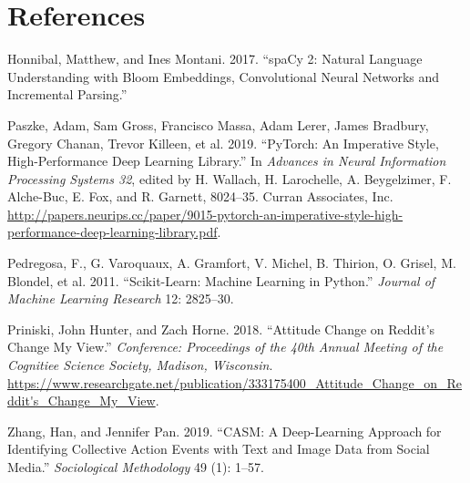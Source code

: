 \documentclass[12pt,]{article}
\begin{document}
\newpage

\hypertarget{references}{%
\section*{References}\label{references}}

\hypertarget{refs}{}
\leavevmode\hypertarget{ref-spacy2}{}%
Honnibal, Matthew, and Ines Montani. 2017. ``spaCy 2: Natural Language
Understanding with Bloom Embeddings, Convolutional Neural Networks and
Incremental Parsing.''

\leavevmode\hypertarget{ref-pytorch}{}%
Paszke, Adam, Sam Gross, Francisco Massa, Adam Lerer, James Bradbury,
Gregory Chanan, Trevor Killeen, et al. 2019. ``PyTorch: An Imperative
Style, High-Performance Deep Learning Library.'' In \emph{Advances in
Neural Information Processing Systems 32}, edited by H. Wallach, H.
Larochelle, A. Beygelzimer, F. Alche-Buc, E. Fox, and R. Garnett,
8024--35. Curran Associates, Inc.
\url{http://papers.neurips.cc/paper/9015-pytorch-an-imperative-style-high-performance-deep-learning-library.pdf}.

\leavevmode\hypertarget{ref-scikit-learn}{}%
Pedregosa, F., G. Varoquaux, A. Gramfort, V. Michel, B. Thirion, O.
Grisel, M. Blondel, et al. 2011. ``Scikit-Learn: Machine Learning in
Python.'' \emph{Journal of Machine Learning Research} 12: 2825--30.

\leavevmode\hypertarget{ref-cmv}{}%
Priniski, John Hunter, and Zach Horne. 2018. ``Attitude Change on
Reddit's Change My View.'' \emph{Conference: Proceedings of the 40th
Annual Meeting of the Cognitiee Science Society, Madison, Wisconsin}.
\url{https://www.researchgate.net/publication/333175400_Attitude_Change_on_Reddit's_Change_My_View}.

\leavevmode\hypertarget{ref-zhang}{}%
Zhang, Han, and Jennifer Pan. 2019. ``CASM: A Deep-Learning Approach for
Identifying Collective Action Events with Text and Image Data from
Social Media.'' \emph{Sociological Methodology} 49 (1): 1--57.





\newpage
\singlespacing 
\end{document}
